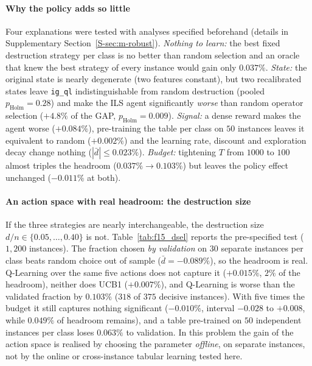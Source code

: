 


\paragraph{Why the policy adds so little}
Four explanations were tested with analyses specified beforehand (details in Supplementary Section~\ref{S-sec:m-robust}). \emph{Nothing to learn:} the best fixed destruction strategy per class is no better than random
selection and an oracle that knew the best strategy of every instance would gain only $0.037\%$. \emph{State:} the original state is nearly degenerate (two features constant), but two recalibrated
states leave \texttt{ig\_ql} indistinguishable from random destruction (pooled $p_{\mathrm{Holm}}=0.28$) and make the ILS agent significantly \emph{worse} than random operator selection ($+4.8\%$ of the GAP,
$p_{\mathrm{Holm}}=0.009$). \emph{Signal:} a dense reward makes the agent worse ($+0.084\%$), pre-training the table per class on $50$ instances leaves it equivalent to random ($+0.002\%$) and
the learning rate, discount and exploration decay change nothing ($|\bar d|\leq0.023\%$). \emph{Budget:} tightening $T$ from $1000$ to $100$ almost triples the headroom ($0.037\%\to0.103\%$) but leaves the
policy effect unchanged ($-0.011\%$ at both).

\paragraph{An action space with real headroom: the destruction size}
If the three strategies are nearly interchangeable, the destruction size $d/n\in\{0.05,\ldots,0.40\}$ is not. Table~\ref{tab:f15_dsel} reports the pre-specified test ($1{,}200$ instances). The fraction
chosen \emph{by validation} on $30$ separate instances per class beats random choice out of sample ($\bar d=-0.089\%$), so the headroom is real. Q-Learning over the same five actions does not capture it
($+0.015\%$, $2\%$ of the headroom), neither does UCB1 ($+0.007\%$), and Q-Learning is worse than the validated fraction by $0.103\%$ ($318$ of $375$ decisive instances). With five times the budget it still
captures nothing significant ($-0.010\%$, interval $-0.028$ to $+0.008$, while $0.049\%$ of headroom remains), and a table pre-trained on $50$ independent instances per class loses $0.063\%$ to validation. In this problem
the gain of the action space is realised by choosing the parameter \emph{offline}, on separate instances, not by the online or cross-instance tabular learning tested here.


